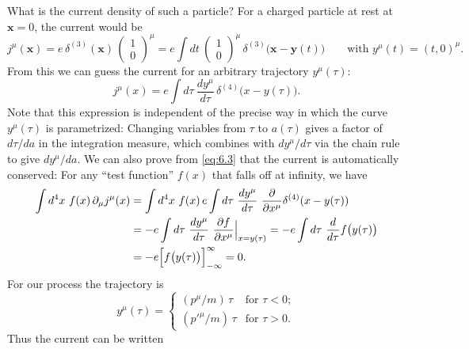 What is the current density of such a particle?  For a charged particle at
rest at $\mathbf{x}=0$, the current would be
\begin{equation}
  j^\mu(\mathbf{x}) = e\,\delta^{(3)}(\mathbf{x})\,
    \begin{pmatrix}1\\ 0\end{pmatrix}^{\mu}
  = e\int dt\ \begin{pmatrix}1\\ 0\end{pmatrix}^{\mu}\,
    \delta^{(3)}\bigl( \mathbf{x} - \mathbf{y}(t) \bigr)
  \qquad\text{with } y^\mu(t) = (t, 0)^\mu .
\end{equation}
From this we can guess the current for an arbitrary trajectory $y^\mu(\tau)$:
\begin{equation}
  j^\mu(x) = e\int d\tau\ \frac{dy^\mu}{d\tau}\,
    \delta^{(4)}\bigl( x - y(\tau) \bigr).
  \label{eq:6.3}
\end{equation}
Note that this expression is independent of the precise way in which the curve
$y^\mu(\tau)$ is parametrized: Changing variables from $\tau$ to
$a(\tau)$ gives a factor of $d\tau/da$ in the integration measure, which
combines with $dy^\mu/d\tau$ via the chain rule to give $dy^\mu/da$.  We can
also prove from \eqref{eq:6.3} that the current is automatically conserved:
For any ``test function'' $f(x)$ that falls off at infinity, we have
\begin{equation}
  \begin{aligned}
    \int d^4x\ f(x)\,\partial_\mu j^\mu(x)
    &= \int d^4x\ f(x)\,e\int d\tau\
      \frac{dy^\mu}{d\tau}\ \frac{\partial}{\partial x^\mu}
      \delta^{(4)}(x-y(\tau))\\
    &= -e\int d\tau\ \frac{dy^\mu}{d\tau}\ \frac{\partial f}{\partial x^\mu}
      \Big|_{x=y(\tau)}
    = -e\int d\tau\ \frac{d}{d\tau}f\bigl( y(\tau) \bigr)\\
    &= -e\Bigl[ f\bigl( y(\tau) \bigr) \Bigr]_{-\infty}^{\infty} = 0 .
  \end{aligned}
\end{equation}
For our process the trajectory is
\begin{equation}
  y^\mu(\tau) = \begin{cases}
    (p^\mu/m)\,\tau & \text{for } \tau < 0;\\
    (p'^{\mu}/m)\,\tau & \text{for } \tau > 0 .
  \end{cases}
\end{equation}
Thus the current can be written
